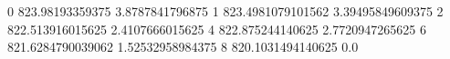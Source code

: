 0 823.98193359375 3.8787841796875
1 823.4981079101562 3.39495849609375
2 822.513916015625 2.4107666015625
4 822.875244140625 2.7720947265625
6 821.6284790039062 1.52532958984375
8 820.1031494140625 0.0
